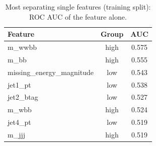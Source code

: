 \begin{table}[!t]
\centering
\caption{Most separating single features (training split): ROC AUC of the feature alone.}
\label{tab:single_auc}
\footnotesize
\setlength{\tabcolsep}{3.5pt}
\begin{tabular}{lcc}
\toprule
Feature & Group & AUC \\
\midrule
m\_wwbb & high & 0.575 \\
m\_bb & high & 0.555 \\
missing\_energy\_magnitude & low & 0.543 \\
jet1\_pt & low & 0.538 \\
jet2\_btag & low & 0.527 \\
m\_wbb & high & 0.524 \\
jet4\_pt & low & 0.519 \\
m\_jjj & high & 0.519 \\
\bottomrule
\end{tabular}
\end{table}
